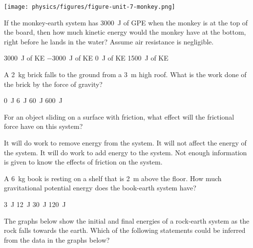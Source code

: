 \documentclass[answers,dvipsnames]{exam}
\begin{document}
\begin{questions}
\begin{center}
    \texttt{[image: physics/figures/figure-unit-7-monkey.png]}
\end{center}

If the monkey-earth system has \SI{3000}{J} of GPE when the monkey is at the top of the board, then how much kinetic energy would the monkey have at the bottom, right before he lands in the water? Assume air resistance is negligible.

\begin{randomizechoices}[norandomize]
    \correctchoice \SI{3000}{J} of KE
    \choice \SI{-3000}{J} of KE
    \choice \SI{0}{J} of KE
    \choice \SI{1500}{J} of KE
\end{randomizechoices}

\question
A \SI{2}{kg} brick falls to the ground from a \SI{3}{m} high roof. What is the work done of the brick by the force of gravity?

\begin{randomizechoices}[norandomize]
    \choice \SI{0}{J}
    \choice \SI{6}{J}
    \correctchoice \SI{60}{J}
    \choice \SI{600}{J}
\end{randomizechoices}

\question 
For an object sliding on a surface with friction, what effect will the frictional force have on this system?

\begin{randomizechoices}[norandomize]
    \correctchoice It will do work to remove energy from the system.
    \choice It will not affect the energy of the system.
    \choice It will do work to add energy to the system.
    \choice Not enough information is given to know the effects of friction on the system.
\end{randomizechoices}

\question
A \SI{6}{kg} book is resting on a shelf that is \SI{2}{m} above the floor. How much gravitational potential energy does the book-earth system have?

\begin{randomizechoices}[norandomize]
    \choice \SI{3}{J}
    \choice \SI{12}{J}
    \choice \SI{30}{J}
    \correctchoice \SI{120}{J}
\end{randomizechoices}

\question
The graphs below show the initial and final energies of a rock-earth system as the rock falls towards the earth. Which of the following statements could be inferred from the data in the graphs below?


\end{questions}
\end{document}
